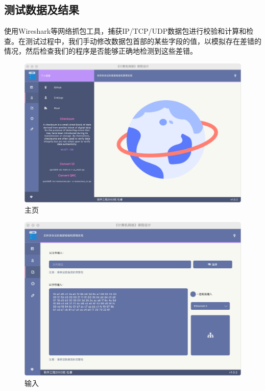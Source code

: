 \documentclass[a4paper,11pt]{article}
\begin{document}
\begin{spacing}{1.2}
\begin{CJK}{UTF8}{gbsn}
\subsection{测试数据及结果}

\noindent 使用Wireshark等网络抓包工具，捕获IP/TCP/UDP数据包进行校验和计算和检查。在测试过程中，我们手动修改数据包首部的某些字段的值，以模拟存在差错的情况，然后检查我们的程序是否能够正确地检测到这些差错。

\begin{figure}[htbp]
    \centering
    \includegraphics[scale=0.2]{index.png}
    \caption{主页}
\end{figure}

\begin{figure}[htbp]
    \centering
    \includegraphics[scale=0.23]{index-input.png}
    \caption{输入}
\end{figure}


\end{CJK}
\end{spacing}
\end{document}
